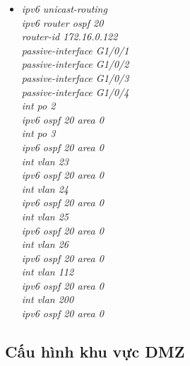 \documentclass[12pt,a4paper]{report}
\begin{document}
\begin{itemize}
\begin{itemize}
        \begin{itemize}
         \item \textit{ipv6 unicast-routing\\
ipv6 router ospf 20\\
router-id 172.16.0.122\\
passive-interface G1/0/1\\
passive-interface G1/0/2\\
passive-interface G1/0/3\\
passive-interface G1/0/4\\
int po 2\\
ipv6 ospf 20 area 0\\
int po 3\\
ipv6 ospf 20 area 0\\
int vlan 23\\
ipv6 ospf 20 area 0\\
int vlan 24\\
ipv6 ospf 20 area 0\\
int vlan 25\\
ipv6 ospf 20 area 0\\
int vlan 26\\
ipv6 ospf 20 area 0\\
int vlan 112\\
ipv6 ospf 20 area 0\\
int vlan 200\\
ipv6 ospf 20 area 0\\}
        
          \end{itemize}
       \end{itemize}
      
\end{itemize}

\subsection{Cấu hình khu vực DMZ }
\end{document}
